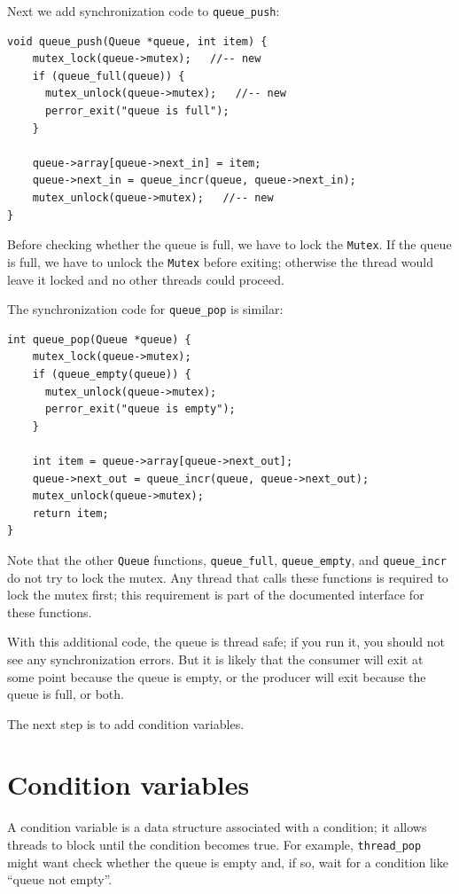 \documentclass[12pt]{book}
\begin{document}
{Next we add synchronization code to \verb"queue_push":

\begin{verbatim}
void queue_push(Queue *queue, int item) {
    mutex_lock(queue->mutex);   //-- new
    if (queue_full(queue)) {
      mutex_unlock(queue->mutex);   //-- new
      perror_exit("queue is full");
    }
  
    queue->array[queue->next_in] = item;
    queue->next_in = queue_incr(queue, queue->next_in);
    mutex_unlock(queue->mutex);   //-- new
}
\end{verbatim}

Before checking whether the queue is full, we have to lock
the {\tt Mutex}.  If the queue is full, we have to unlock
the {\tt Mutex} before exiting; otherwise the thread would leave
it locked and no other threads could proceed.

The synchronization code for \verb"queue_pop" is similar:

\begin{verbatim}
int queue_pop(Queue *queue) {
    mutex_lock(queue->mutex);
    if (queue_empty(queue)) {
      mutex_unlock(queue->mutex);
      perror_exit("queue is empty");
    }
  
    int item = queue->array[queue->next_out];
    queue->next_out = queue_incr(queue, queue->next_out);
    mutex_unlock(queue->mutex);
    return item;
}
\end{verbatim}

Note that the other {\tt Queue} functions, \verb"queue_full",
\verb"queue_empty", and \verb"queue_incr" do not try to lock
the mutex.  Any thread that calls these functions is required to
lock the mutex first; this requirement is part of the documented
interface for these functions.

With this additional code, the queue is thread safe; if you run it, you
should not see any synchronization errors.  But it is likely
that the consumer will exit at some point because the queue is
empty, or the producer will exit because the queue is full,
or both.

The next step is to add condition variables.


\section{Condition variables}

A condition variable is a data structure associated with a condition;
it allows threads to block until the condition becomes true.  For
example, \verb"thread_pop" might want check whether the queue is
empty and, if so, wait for a condition like ``queue not empty''.

}
\end{document}
